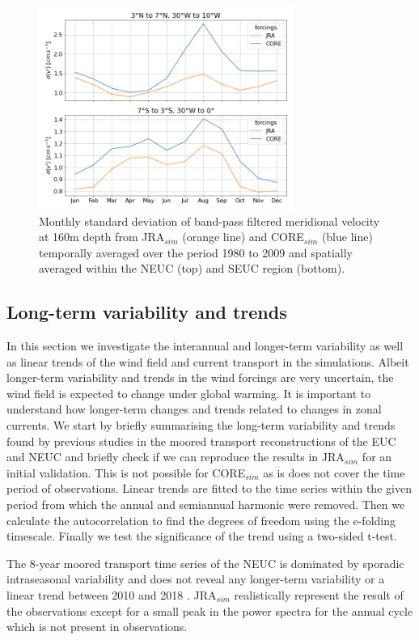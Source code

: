 \documentclass[os, manuscript]{copernicus}
\begin{document}
\begin{figure}[t]
	\includegraphics[width=8.3cm]{../../figures/paper/f07_INALT20_JRA_CORE_TIW_NEUC_SEUC_clim_1980_2009.png}
	\caption{Monthly standard deviation of band-pass filtered meridional velocity at 160m depth from JRA$_{sim}$ (orange line) and CORE$_{sim}$ (blue line) temporally averaged over the period 1980 to 2009 and spatially averaged within the NEUC (top) and SEUC region (bottom).}
	\label{fig_TIW_clim}
\end{figure}   

\subsection{Long-term variability and trends}
In this section we investigate the interannual and longer-term variability as well as linear trends of the wind field and current transport in the simulations. Albeit longer-term variability and trends in the wind forcings are very uncertain, the wind field is expected to change under global warming. It is important to understand how longer-term changes and trends  related to changes in zonal currents. We start by briefly summarising the long-term variability and trends found by previous studies in the moored transport reconstructions of the EUC \citep{Brandt2021a} and NEUC \citep{Burmeister2020} and briefly check if we can reproduce the results in JRA$_{sim}$ for an initial validation. This is not possible for CORE$_{sim}$ as is does not cover the time period of observations. Linear trends are fitted to the time series within the given period from which the annual and semiannual harmonic were removed. Then we calculate the autocorrelation to find the degrees of freedom using the e-folding timescale. Finally we test the significance of the trend using a two-sided t-test.

The 8-year moored transport time series of the NEUC is dominated by sporadic intraseasonal variability and does not reveal any longer-term variability or a linear trend between 2010 and 2018 \cite[Fig. \ref{fig_EUC_NEUC_ts}c,d;][]{Burmeister2020}. JRA$_{sim}$ realistically represent the result of the observations except for a small peak in the power spectra for the annual cycle which is not present in observations.
\end{document}
